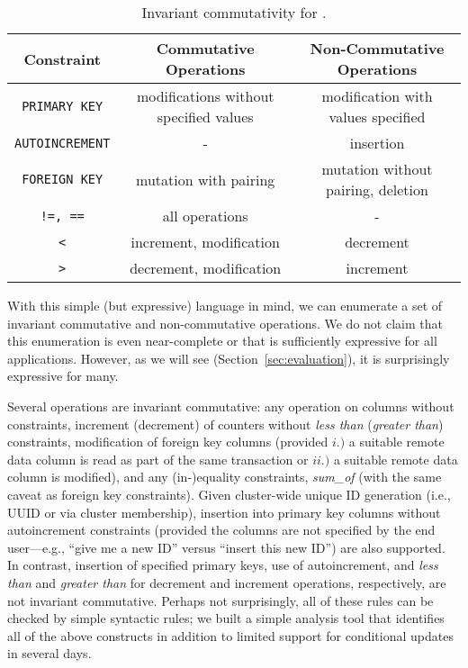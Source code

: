 \begin{table*}
\begin{tabular}{|c|c|c|}
\hline
Constraint & Commutative Operations & Non-Commutative Operations \\\hline
\texttt{PRIMARY KEY} & modifications without specified values & modification with values specified \\
\texttt{AUTOINCREMENT} & - & insertion \\
\texttt{FOREIGN KEY} & mutation with pairing & mutation without pairing, deletion\\
\texttt{!=, ==} & all operations & - \\
\texttt{<} & increment, modification & decrement \\
\texttt{>} & decrement, modification & increment\\\hline

\end{tabular}
\caption{Invariant commutativity for \lang.}
\label{table:invariants}
\end{table*}

With this simple (but expressive) language in mind, we can enumerate a
set of invariant commutative and non-commutative operations. We do not
claim that this enumeration is even near-complete or that \lang is
sufficiently expressive for all applications. However, as we will see
(Section~\ref{sec:evaluation}), it is surprisingly expressive for many.

Several operations are invariant commutative: any operation on columns
without constraints, increment (decrement) of counters without
\textit{less than} (\textit{greater than}) constraints, modification
of foreign key columns (provided $i.)$ a suitable remote data column
is read as part of the same transaction or $ii.)$ a suitable remote
data column is modified), and any (in-)equality constraints,
\textit{sum\_of} (with the same caveat as foreign key
constraints). Given cluster-wide unique ID generation (i.e., UUID or
via cluster membership), insertion into primary key columns without
autoincrement constraints (provided the columns are not specified by
the end user---e.g., ``give me a new ID'' versus ``insert this new
ID'') are also supported. In contrast, insertion of specified primary
keys, use of autoincrement, and \textit{less than} and \textit{greater
  than} for decrement and increment operations, respectively, are not
invariant commutative. Perhaps not surprisingly, all of these rules
can be checked by simple syntactic rules; we built a simple \lang
analysis tool that identifies all of the above constructs in addition
to limited support for conditional updates in several days.

